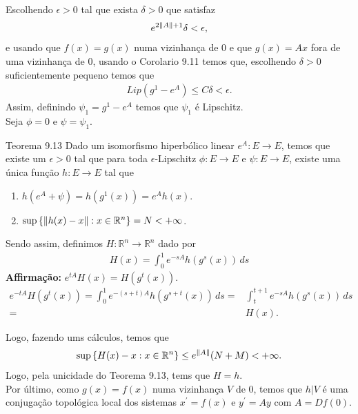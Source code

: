 \begin{frame}{}
  \begin{block}{}
    Escolhendo $\epsilon>0$ tal que exista $\delta>0$ que satisfaz
    \begin{align*}
      e^{2\left\|A\right\|+1}\delta<\epsilon,
    \end{align*}
    e usando que $f(x)=g(x)$ numa vizinhança de $0$ e que $g(x)=Ax$ fora de uma vizinhança de $0$, usando o Corolario 9.11 temos que, escolhendo $\delta>0$ suficientemente pequeno temos que
    \begin{align*}
      Lip(g^{1}-e^{A})\leq C\delta<\epsilon.
    \end{align*}
    Assim, definindo $\psi_1=g^1-e^{A}$ temos que $\psi_1$ é Lipschitz.\\
    Seja $\phi=0$ e $\psi=\psi_1$.
  \end{block}
\end{frame}

\begin{frame}{}
  \begin{block}{Teorema 9.13}
    Dado um isomorfismo hiperbólico linear $e^{A}:E\to E$, temos que existe um $\epsilon>0$ tal que para toda $\epsilon$-Lipschitz $\phi:E\to E$ e $\psi:E\to E$, existe uma única função $h:E\to E$ tal que
    \begin{enumerate}
      \item $h(e^{A}+\psi)=h(g^1(x))=e^Ah(x)$.
      \item $\sup\left\{ \left\|h(x)-x\right\|:x\in\mathbb{R}^{n}\right\}=N<+\infty$.
    \end{enumerate}
  \end{block}
  \begin{block}{}
    Sendo assim, definimos $H:\mathbb{R}^{n}\to\mathbb{R}^{n}$ dado por
    \begin{align*}
      H(x)=\int_{0}^{1}e^{-sA}h(g^s(x))\,ds
    \end{align*}
    \textbf{Affirmação:} $e^{tA}H(x)=H(g^{t}(x))$.
    \begin{align*}
      e^{-tA}H(g^{t}(x))=\int_{0}^{1}e^{-(s+t)A}h(g^{s+t}(x))\,ds=&\int_{t}^{t+1}e^{-sA}h(g^{s}(x))\,ds\\
      =&H(x).
    \end{align*}
  \end{block}
\end{frame}

\begin{frame}{}
  \begin{block}{}
    Logo, fazendo ums cálculos, temos que
    \begin{align*}
      \sup\left\{ H(x)-x:x\in\mathbb{R}^{n} \right\}\leq e^{\left\|A\right\|}(N+M)<+\infty.
    \end{align*}
    Logo, pela unicidade do Teorema 9.13, tems que $H=h$.\\
    Por último, como $g(x)=f(x)$ numa vizinhança $V$ de $0$, temos que $h\big|V$ é uma conjugação topológica local dos sistemas $x^{\prime}=f(x)$ e $y^{\prime}=Ay$ com $A=Df(0)$. 
  \end{block} 
\end{frame}
